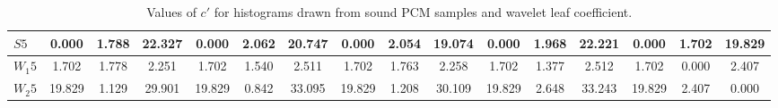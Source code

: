 \begin{table*}[h!]
\begin{center}
\begin{tabular}{| l | c | c | c | c | c | c | c | c | c | c | c | c | c | c | c |}
$S5$ & 0.000  & 1.788  & 22.327  & 0.000  & 2.062  & 20.747  & 0.000  & 2.054  & 19.074  & 0.000  & 1.968  & 22.221  & 0.000  & 1.702  & 19.829 \\\hline
$W_1 5$ & 1.702  & 1.778  & 2.251  & 1.702  & 1.540  & 2.511  & 1.702  & 1.763  & 2.258  & 1.702  & 1.377  & 2.512  & 1.702  & 0.000  & 2.407 \\\hline
$W_2 5$ & 19.829  & 1.129  & 29.901  & 19.829  & 0.842  & 33.095  & 19.829  & 1.208  & 30.109  & 19.829  & 2.648  & 33.243  & 19.829  & 2.407  & 0.000 \\\hline
\end{tabular}
\caption{Values of $c'$ for histograms drawn from sound PCM samples and wavelet leaf coefficient.}
\end{center}
\end{table*}